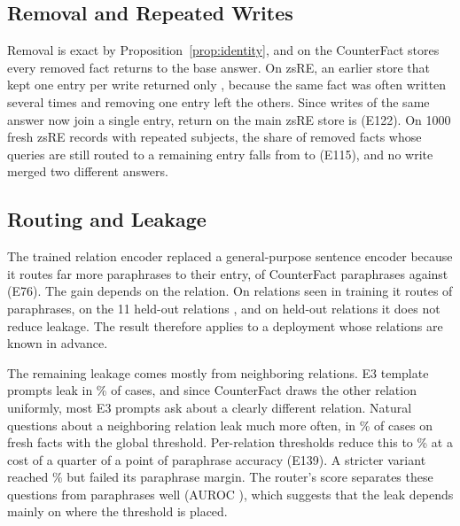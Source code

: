 \documentclass[journal,10pt]{IEEEtran}
\begin{document}
\subsection{Removal and Repeated Writes}
Removal is exact by Proposition~\ref{prop:identity}, and on the CounterFact stores every removed fact returns to
the base answer. On zsRE, an earlier store that kept one entry per write returned only
, because the same fact was often written several times and removing one
entry left the others. Since writes of the same answer now join a single entry, return on the main zsRE store is
 (E122). On 1000 fresh zsRE records with repeated subjects, the share
of removed facts whose queries are still routed to a remaining entry falls from  to
 (E115), and no write merged two different answers.

\subsection{Routing and Leakage}
\label{sec:leak}
The trained relation encoder replaced a general-purpose sentence encoder because it routes far more paraphrases
to their entry,  of CounterFact paraphrases against
 (E76). The gain depends on the relation. On relations seen in
training it routes  of paraphrases, on the 11
held-out relations , and on held-out relations
it does not reduce leakage. The result therefore applies to a deployment whose relations are known in advance.

The remaining leakage comes mostly from neighboring relations. E3 template prompts leak in
\% of cases, and since CounterFact draws the other relation uniformly,
most E3 prompts ask about a clearly different relation. Natural questions about a neighboring relation leak much
more often, in \% of cases on fresh facts with the global
threshold. Per-relation thresholds reduce this to \% at a cost
of a quarter of a point of paraphrase accuracy (E139). A stricter variant reached
\% but failed its paraphrase margin. The router's score
separates these questions from paraphrases well (AUROC ),
which suggests that the leak depends mainly on where the threshold is placed.
\end{document}
